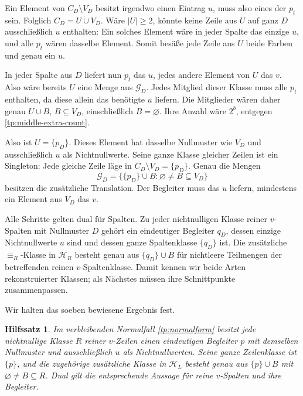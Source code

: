 \documentclass[a4paper,11pt]{article}
\newcommand{\HL}{\mathcal H_L}
\newcommand{\HR}{\mathcal H_R}
\newtheorem{lemma}{Hilfssatz}
\theoremstyle{remark}
\begin{document}
Ein Element von \(C_D\setminus V_D\) besitzt irgendwo einen
Eintrag \(u\), muss also eines der \(p_t\) sein. Folglich
\(C_D=U\mathbin{\dot\cup}V_D\). Wäre \(|U|\ge2\), könnte
keine Zeile aus \(U\) auf ganz \(D\) ausschließlich \(u\)
enthalten: Ein solches Element wäre in jeder Spalte das einzige
\(u\), und alle \(p_t\) wären dasselbe Element. Somit besäße
jede Zeile aus \(U\) beide Farben und genau ein \(u\).

In jeder Spalte aus \(D\) liefert nun \(p_t\) das \(u\), jedes
andere Element von \(U\) das \(v\). Also wäre bereits \(U\)
eine Menge aus \(\mathcal G_D\). Jedes Mitglied dieser Klasse muss
alle \(p_t\) enthalten, da diese allein das benötigte \(u\)
liefern. Die Mitglieder wären daher genau \(U\cup B\),
\(B\subseteq V_D\), einschließlich \(B=\varnothing\).
Ihre Anzahl wäre \(2^b\), entgegen
\eqref{tp:middle-extra-count}.

Also ist \(U=\{p_D\}\). Dieses Element hat dasselbe Nullmuster
wie \(V_D\) und ausschließlich \(u\) als Nichtnullwerte. Seine
ganze Klasse gleicher Zeilen ist ein Singleton: Jede gleiche Zeile
läge in \(C_D\setminus V_D=\{p_D\}\). Genau die Mengen
\begin{equation}
 \mathcal G_D=\bigl\{\{p_D\}\cup B:
                 \varnothing\ne B\subseteq V_D\bigr\}
 \label{tp:middle-row-companion}
\end{equation}
besitzen die zusätzliche Translation. Der Begleiter muss das
\(u\) liefern, mindestens ein Element aus \(V_D\) das \(v\).

Alle Schritte gelten dual für Spalten. Zu jeder nichtnulligen Klasse
reiner \(v\)-Spalten mit Nullmuster \(D\) gehört ein eindeutiger
Begleiter \(q_D\), dessen einzige Nichtnullwerte \(u\) sind und
dessen ganze Spaltenklasse \(\{q_D\}\) ist. Die zusätzliche
\(\equiv_R\)-Klasse in \(\HR\) besteht genau aus
\(\{q_D\}\cup B\) für nichtleere Teilmengen der betreffenden
reinen \(v\)-Spaltenklasse. Damit kennen wir beide Arten
rekonstruierter Klassen; als Nächstes müssen ihre Schnittpunkte
zusammenpassen.


Wir halten das soeben bewiesene Ergebnis fest.
\begin{lemma}\label{tp:companions}
Im verbleibenden Normalfall \eqref{tp:normalform} besitzt jede nichtnullige
Klasse $R$ reiner $v$-Zeilen einen eindeutigen
Begleiter $p$ mit demselben Nullmuster und ausschließlich $u$ als
Nichtnullwerten. Seine ganze Zeilenklasse ist $\{p\}$, und die zugehörige
zusätzliche Klasse in $\HL$ besteht genau aus $\{p\}\cup B$ mit
$\varnothing\ne B\subseteq R$. Dual gilt die entsprechende Aussage
für reine $v$-Spalten und ihre Begleiter.
\end{lemma}
\end{document}
